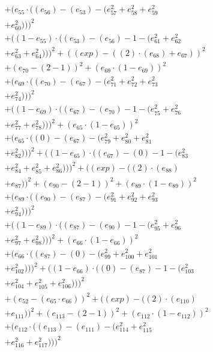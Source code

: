 \documentclass[10pt, a4paper]{article}
\begin{document}
\begin{align*}
& + (e_{55}  \cdot  ((e_{56}) - (e_{53}) - (e_{57}^{2} + e_{58}^{2} + e_{59}^{2} \\
& + e_{60}^{2})))^{2} \\
& + ((1 - e_{55})  \cdot  ((e_{53}) - (e_{56}) - 1 - (e_{61}^{2} + e_{62}^{2} \\
& + e_{63}^{2} + e_{64}^{2})))^{2} + ((exp) - ((2)  \cdot  (e_{68}) + e_{67}))^{2} \\
& + (e_{70} - (2 - 1))^{2} + (e_{69}  \cdot  (1 - e_{69}))^{2} \\
& + (e_{69}  \cdot  ((e_{70}) - (e_{67}) - (e_{71}^{2} + e_{72}^{2} + e_{73}^{2} \\
& + e_{74}^{2})))^{2} \\
& + ((1 - e_{69})  \cdot  ((e_{67}) - (e_{70}) - 1 - (e_{75}^{2} + e_{76}^{2} \\
& + e_{77}^{2} + e_{78}^{2})))^{2} + (e_{65}  \cdot  (1 - e_{65}))^{2} \\
& + (e_{65}  \cdot  ((0) - (e_{67}) - (e_{79}^{2} + e_{80}^{2} + e_{81}^{2} \\
& + e_{82}^{2})))^{2} + ((1 - e_{65})  \cdot  ((e_{67}) - (0) - 1 - (e_{83}^{2} \\
& + e_{84}^{2} + e_{85}^{2} + e_{86}^{2})))^{2} + ((exp) - ((2)  \cdot  (e_{88}) \\
& + e_{87}))^{2} + (e_{90} - (2 - 1))^{2} + (e_{89}  \cdot  (1 - e_{89}))^{2} \\
& + (e_{89}  \cdot  ((e_{90}) - (e_{87}) - (e_{91}^{2} + e_{92}^{2} + e_{93}^{2} \\
& + e_{94}^{2})))^{2} \\
& + ((1 - e_{89})  \cdot  ((e_{87}) - (e_{90}) - 1 - (e_{95}^{2} + e_{96}^{2} \\
& + e_{97}^{2} + e_{98}^{2})))^{2} + (e_{66}  \cdot  (1 - e_{66}))^{2} \\
& + (e_{66}  \cdot  ((e_{87}) - (0) - (e_{99}^{2} + e_{100}^{2} + e_{101}^{2} \\
& + e_{102}^{2})))^{2} + ((1 - e_{66})  \cdot  ((0) - (e_{87}) - 1 - (e_{103}^{2} \\
& + e_{104}^{2} + e_{105}^{2} + e_{106}^{2})))^{2} \\
& + (e_{52} - (e_{65}  \cdot  e_{66}))^{2} + ((exp) - ((2)  \cdot  (e_{110}) \\
& + e_{111}))^{2} + (e_{113} - (2 - 1))^{2} + (e_{112}  \cdot  (1 - e_{112}))^{2} \\
& + (e_{112}  \cdot  ((e_{113}) - (e_{111}) - (e_{114}^{2} + e_{115}^{2} \\
& + e_{116}^{2} + e_{117}^{2})))^{2} \\

\end{align*}
\end{document}
